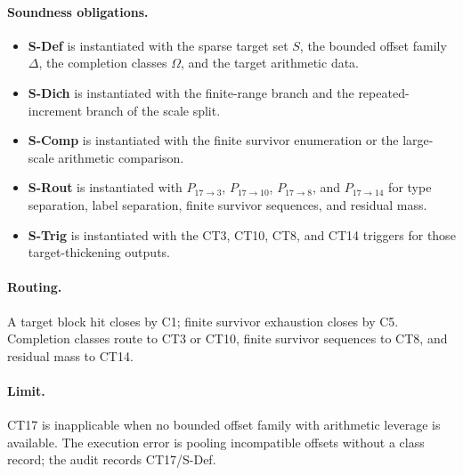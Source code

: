 \documentclass[
  11pt,
]{article}
\providecommand{\tightlist}{%
  \setlength{\itemsep}{0pt}\setlength{\parskip}{0pt}}
\theoremstyle{definition}
\newcommand{\ctpar}[1]{\paragraph{#1.}}
\begin{document}
\ctpar{Soundness obligations}
\begin{itemize}
\tightlist
\item \textbf{S-Def} is instantiated with the sparse target set \(S\), the bounded offset family \(\Delta\), the completion classes \(\Omega\), and the target arithmetic data.
\item \textbf{S-Dich} is instantiated with the finite-range branch and the repeated-increment branch of the scale split.
\item \textbf{S-Comp} is instantiated with the finite survivor enumeration or the large-scale arithmetic comparison.
\item \textbf{S-Rout} is instantiated with \(P_{17\to3}\), \(P_{17\to10}\), \(P_{17\to8}\), and \(P_{17\to14}\) for type separation, label separation, finite survivor sequences, and residual mass.
\item \textbf{S-Trig} is instantiated with the CT3, CT10, CT8, and CT14 triggers for those target-thickening outputs.
\end{itemize}

\ctpar{Routing}
A target block hit closes by C1; finite survivor exhaustion closes by
C5.  Completion classes route to
CT3 or CT10, finite survivor sequences to CT8, and residual mass to CT14.

\ctpar{Limit}
CT17 is inapplicable when no bounded offset family with arithmetic leverage
is available. The execution error is pooling incompatible offsets without a
class record; the audit records CT17/S-Def.
\end{document}
